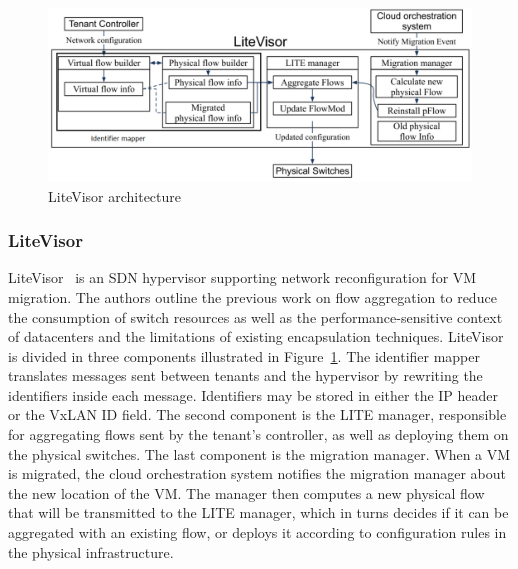 

\begin{figure}[ht]
    \centering
    \includegraphics[scale=0.5]{figures/litevisor.pdf}
    \caption{LiteVisor architecture~\cite{Litevisor-Yang2018}}
    \label{fig:litevisor}
\end{figure}

\subsubsection{LiteVisor}
LiteVisor~\cite{Litevisor-Yang2018} is an SDN hypervisor supporting network reconfiguration for VM migration.
The authors outline the previous work on flow aggregation to reduce the consumption of switch resources as well as the performance-sensitive context of datacenters and the limitations of existing encapsulation techniques.
LiteVisor is divided in three components illustrated in Figure~\ref{fig:litevisor}. The identifier mapper translates messages sent between tenants and the hypervisor by rewriting the identifiers inside each message. Identifiers may be stored in either the IP header or the VxLAN ID field.
The second component is the LITE manager, responsible for aggregating flows sent by the tenant's controller, as well as deploying them on the physical switches. 
The last component is the migration manager. When a VM is migrated, the cloud orchestration system notifies the migration manager about the new location of the VM. The manager then computes a new physical flow that will be transmitted to the LITE manager, which in turns decides if it can be aggregated with an existing flow, or deploys it according to configuration rules in the physical infrastructure.




